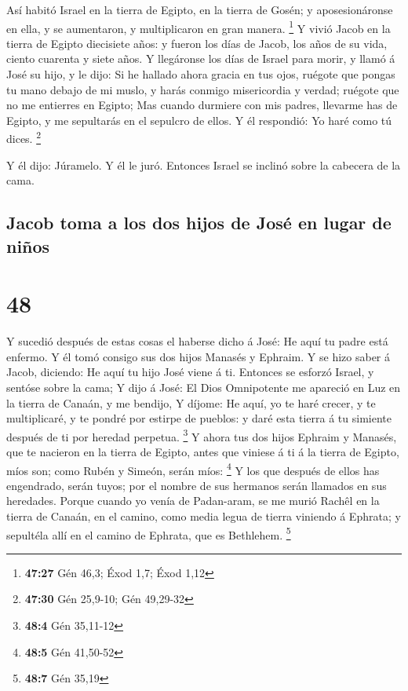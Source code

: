  Así habitó Israel en la tierra de Egipto, en la tierra
de Gosén; y aposesionáronse en ella, y se aumentaron, y multiplicaron en
gran manera. \footnote{\textbf{47:27} Gén 46,3; Éxod 1,7; Éxod 1,12}
 Y vivió Jacob en la tierra de Egipto diecisiete años: y
fueron los días de Jacob, los años de su vida, ciento cuarenta y siete
años.  Y llegáronse los días de Israel para morir, y
llamó á José su hijo, y le dijo: Si he hallado ahora gracia en tus ojos,
ruégote que pongas tu mano debajo de mi muslo, y harás conmigo
misericordia y verdad; ruégote que no me entierres en Egipto;
 Mas cuando durmiere con mis padres, llevarme has de
Egipto, y me sepultarás en el sepulcro de ellos. Y él respondió: Yo haré
como tú dices. \footnote{\textbf{47:30} Gén 25,9-10; Gén 49,29-32}

 Y él dijo: Júramelo. Y él le juró. Entonces Israel se
inclinó sobre la cabecera de la cama.

\hypertarget{jacob-toma-a-los-dos-hijos-de-josuxe9-en-lugar-de-niuxf1os}{%
\subsection{Jacob toma a los dos hijos de José en lugar de
niños}\label{jacob-toma-a-los-dos-hijos-de-josuxe9-en-lugar-de-niuxf1os}}

\hypertarget{section-47}{%
\section{48}\label{section-47}}

 Y sucedió después de estas cosas el haberse dicho á José:
He aquí tu padre está enfermo. Y él tomó consigo sus dos hijos Manasés y
Ephraim.  Y se hizo saber á Jacob, diciendo: He aquí tu
hijo José viene á ti. Entonces se esforzó Israel, y sentóse sobre la
cama;  Y dijo á José: El Dios Omnipotente me apareció en
Luz en la tierra de Canaán, y me bendijo,  Y díjome: He
aquí, yo te haré crecer, y te multiplicaré, y te pondré por estirpe de
pueblos: y daré esta tierra á tu simiente después de ti por heredad
perpetua. \footnote{\textbf{48:4} Gén 35,11-12}  Y ahora
tus dos hijos Ephraim y Manasés, que te nacieron en la tierra de Egipto,
antes que viniese á ti á la tierra de Egipto, míos son; como Rubén y
Simeón, serán míos: \footnote{\textbf{48:5} Gén 41,50-52} 
Y los que después de ellos has engendrado, serán tuyos; por el nombre de
sus hermanos serán llamados en sus heredades.  Porque
cuando yo venía de Padan-aram, se me murió Rachêl en la tierra de
Canaán, en el camino, como media legua de tierra viniendo á Ephrata; y
sepultéla allí en el camino de Ephrata, que es Bethlehem. \footnote{\textbf{48:7}
  Gén 35,19}


